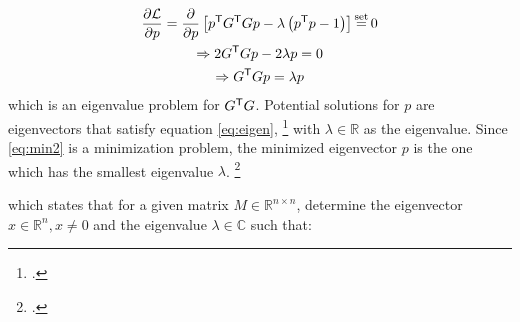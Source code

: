 \begin{gather}
    \frac{\partial \mathcal{L}}{\partial p} = \frac{\partial}{\partial p} \left[ p^\T G^\T Gp - \lambda \left( p^\T p - 1 \right) \right] \seteq 0 \nonumber \\
    \Rightarrow 2G^\T Gp - 2 \lambda p = 0 \nonumber \\
    \Rightarrow G^\T Gp = \lambda p \label{eq:eigen}
\end{gather}
which is an eigenvalue problem for $G^{\mathsf{T}} G$. Potential solutions for $p$ are eigenvectors that satisfy equation \ref{eq:eigen}, \footcite[][]{nayarLinearCamera2021} with $\lambda \in \mathbb{R}$ as the eigenvalue. Since \ref{eq:min2} is a minimization problem, the minimized eigenvector $p$ is the one which has the smallest eigenvalue $\lambda$. \footcite[][2]{ghojoghEigenvalueGeneralized2023}

which states that for a given matrix $M \in \mathbb{R}^{n \times n}$, determine the eigenvector $x \in \mathbb{R}^n, x \neq 0$ and the eigenvalue $\lambda \in \mathbb{C}$ such that:



